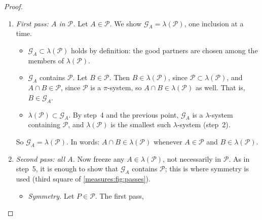 \begin{notechapter}
\begin{proof}
\begin{enumerate}[nosep]
\begin{itemize}[nosep]
                be in $\mathcal G_A$. Their union is in
                $\lambda(\mathcal P)$ by condition~(3) for
                $\lambda(\mathcal P)$. Moreover
                $A\cap\bigcup_nB_n = \bigcup_n(A\cap B_n)$, and the sets
                $A\cap B_n$ are in $\lambda(\mathcal P)$ and increase
                with $n$, since the $B_n$ do; condition~(3) for
                $\lambda(\mathcal P)$ puts their union in
                $\lambda(\mathcal P)$. So
                $\bigcup_nB_n\in\mathcal G_A$.
        \end{itemize}
        What remains is to see that $\mathcal G_A$ contains
        $\mathcal P$; this is where the intersections of $\mathcal P$
        come in.
  \item \emph{First pass: $A$ in $\mathcal P$.} Let $A\in\mathcal P$. We
        show $\mathcal G_A = \lambda(\mathcal P)$, one inclusion at a
        time.
        \begin{itemize}[nosep]
          \item $\mathcal G_A\subset\lambda(\mathcal P)$ holds by
                definition: the good partners are chosen among the
                members of $\lambda(\mathcal P)$.
          \item $\mathcal G_A$ contains $\mathcal P$. Let
                $B\in\mathcal P$. Then $B\in\lambda(\mathcal P)$, since
                $\mathcal P\subset\lambda(\mathcal P)$, and
                $A\cap B\in\mathcal P$, since $\mathcal P$ is a
                $\pi$-system, so $A\cap B\in\lambda(\mathcal P)$ as
                well. That is, $B\in\mathcal G_A$.
          \item $\lambda(\mathcal P)\subset\mathcal G_A$. By step~4 and
                the previous point, $\mathcal G_A$ is a $\lambda$-system
                containing $\mathcal P$, and $\lambda(\mathcal P)$ is the
                smallest such $\lambda$-system (step~2).
        \end{itemize}
        So $\mathcal G_A = \lambda(\mathcal P)$. In words:
        $A\cap B\in\lambda(\mathcal P)$ whenever $A\in\mathcal P$ and
        $B\in\lambda(\mathcal P)$.
  \item \emph{Second pass: all $A$.} Now freeze any
        $A\in\lambda(\mathcal P)$, not necessarily in $\mathcal P$. As in
        step~5, it is enough to show that $\mathcal G_A$ contains
        $\mathcal P$; this is where symmetry is used (third square of
        \cref{measures:fig:passes}).
        \begin{itemize}[nosep]
          \item \emph{Symmetry.} Let $P\in\mathcal P$. The first pass,

\end{itemize}
\end{enumerate}
\end{proof}
\end{notechapter}
